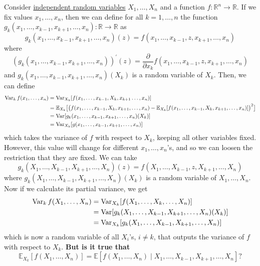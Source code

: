   Consider \hyperref[prob-def:independent-random-variables]{independent random variables} $X_1, \ldots, X_n$ and a function $f: \mathbb{R}^n \to \mathbb{R}$. If we fix values $x_1, \ldots, x_n$, then we can define for all $k = 1, \ldots, n$ the function $g_{k}(x_1, \ldots, x_{k-1}, x_{k+1}, \ldots, x_n): \mathbb{R} \rightarrow \mathbb{R}$ as 
  \begin{equation}
    g_{k}(x_1, \ldots, x_{k-1}, x_{k+1}, \ldots, x_n)(z) = f(x_1, \ldots, x_{k-1}, z, x_{k+1}, \ldots, x_n)
  \end{equation}
  where 
  \begin{equation}
    (g_{k}(x_1, \ldots, x_{k-1}, x_{k+1}, \ldots, x_n))^\prime (z) = \frac{\partial}{\partial x_k} f(x_1, \ldots, x_{k-1}, z, x_{k+1}, \ldots, x_n)
  \end{equation}
  and $g_k (x_1, \ldots, x_{k-1}, x_{k+1}, \ldots, x_n) (X_k)$ is a random variable of $X_k$. Then, we can define 
  \begin{align*}
      \operatorname{Var}_k f(x_1, \ldots, x_n) & = \operatorname{Var}_{X_k} [ f(x_1, \ldots, x_{k-1}, X_k, x_{k+1} \ldots, x_n)] \\ 
      & = \mathbb{E}_{X_k} \big[ \big( f (x_1, \ldots, x_{k-1}, X_k, x_{k+1}, \ldots, x_n) - \mathbb{E}_{X_k} [f (x_1, \ldots, x_{k-1}, X_k, x_{k+1}, \ldots, x_n)] \big)^2 \big] \\
      & = \operatorname{Var}[g_{k} (x_1, \ldots, x_{k-1}, x_{k+1}, \ldots, x_n) (X_k)] \\
      & = \operatorname{Var}_{X_k} [g(x_1, \ldots, x_{k-1}, x_{k+1}, \ldots, x_n)] 
  \end{align*}
  which takes the variance of $f$ with respect to $X_k$, keeping all other variables fixed. However, this value will change for different $x_1, \ldots, x_n$'s, and so we can loosen the restriction that they are fixed. We can take 
  \begin{equation}
    g_k (X_1, \ldots, X_{k-1}, X_{k+1}, \ldots, X_n) (z) = f(X_1, \ldots, X_{k-1}, z, X_{k+1}, \ldots, X_n)
  \end{equation}
  where $g_k (X_1, \ldots, X_{k-1}, X_{k+1}, \ldots, X_n) (X_k)$ is a random variable of $X_1, \ldots, X_n$. Now if we calculate its partial variance, we get 
  \begin{align*}
      \operatorname{Var}_k f(X_1, \ldots, X_n) & = \operatorname{Var}_{X_k} [f(X_1, \ldots, X_k, \ldots, X_n)]\\
      & = \operatorname{Var} [g_k (X_1, \ldots, X_{k-1}, X_{k+1}, \ldots, X_n) (X_k)] \\
      & = \operatorname{Var}_{X_k} [g_k (X_1, \ldots, X_{k-1}, X_{k+1}, \ldots, X_n)]
  \end{align*}
  which is now a random variable of all $X_i$'s, $i \neq k$, that outputs the variance of $f$ with respect to $X_k$. \textbf{But is it true that }
  \begin{equation}
    \mathbb{E}_{X_k} [ f(X_1, \ldots, X_n)] = \mathbb{E}[ f(X_1, \ldots, X_n) \mid X_1, \ldots, X_{k-1}, X_{k+1}, \ldots, X_n] ?
  \end{equation}



